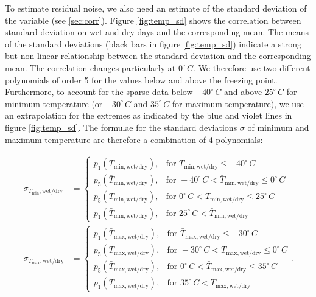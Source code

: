 \documentclass[
11pt, %
english, %
singlespacing, %
headsepline, %
]{MastersDoctoralThesis} %
\begin{document}
\begin{NoHyper}
\begin{refsection}
To estimate residual noise, we also need an estimate of the standard deviation of the variable (see \autoref{sec:corr}). Figure \ref{fig:temp_sd} shows the correlation between standard deviation on wet and dry days and the corresponding mean. The means of the standard deviations (black bars in figure \ref{fig:temp_sd}) indicate a strong but non-linear relationship between the standard deviation and the corresponding mean. The correlation changes particularly at $0^\circ\, C$. We therefore use two different polynomials of order 5 for the values below and above the freezing point. Furthermore, to account for the sparse data below $-40^\circ\, C$  and above $25^\circ\, C$ for minimum temperature (or $-30^\circ\, C$ and $35^\circ\, C$ for maximum temperature), we use an extrapolation for the extremes as indicated by the blue and violet lines in figure \ref{fig:temp_sd}. The formulae for the standard deviations $\sigma$ of minimum and maximum temperature are therefore a combination of 4 polynomials:

\begin{align}
\sigma_{T_\mathrm{min},\mathrm{wet/dry}} &= \begin{cases}
p_1(\bar{T}_{\mathrm{min}, \mathrm{wet/dry}}), & \text{for } \bar{T}_{\mathrm{min}, \mathrm{wet/dry}} \leq -40^\circ\, C \\
p_5(\bar{T}_{\mathrm{min}, \mathrm{wet/dry}}), & \text{for } -40^\circ\, C < \bar{T}_{\mathrm{min}, \mathrm{wet/dry}} \leq 0^\circ\, C \\
p_5(\bar{T}_{\mathrm{min}, \mathrm{wet/dry}}), & \text{for } 0^\circ\, C < \bar{T}_{\mathrm{min}, \mathrm{wet/dry}} \leq 25^\circ\, C \\
p_1(\bar{T}_{\mathrm{min}, \mathrm{wet/dry}}), & \text{for } 25^\circ\, C < \bar{T}_{\mathrm{min}, \mathrm{wet/dry}}
\end{cases} \nonumber \\
\sigma_{T_\mathrm{max},\mathrm{wet/dry}} &= \begin{cases}
p_1(\bar{T}_{\mathrm{max}, \mathrm{wet/dry}}), & \text{for } \bar{T}_{\mathrm{max}, \mathrm{wet/dry}} \leq -30^\circ\, C \\
p_5(\bar{T}_{\mathrm{max}, \mathrm{wet/dry}}), & \text{for } -30^\circ\, C < \bar{T}_{\mathrm{max}, \mathrm{wet/dry}} \leq 0^\circ\, C \\
p_5(\bar{T}_{\mathrm{max}, \mathrm{wet/dry}}), & \text{for } 0^\circ\, C < \bar{T}_{\mathrm{max}, \mathrm{wet/dry}} \leq 35^\circ\, C \\
p_1(\bar{T}_{\mathrm{max}, \mathrm{wet/dry}}), & \text{for } 35^\circ\, C < \bar{T}_{\mathrm{max}, \mathrm{wet/dry}}
\end{cases}. \label{eq:temp_sd}
\end{align}


\end{refsection}
\end{NoHyper}
\end{document}
